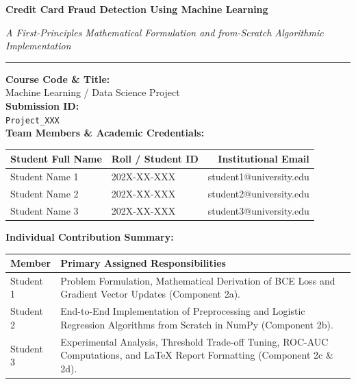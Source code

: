 \documentclass[11pt,a4paper]{article}
\begin{document}
\begin{titlepage}
    \centering
    \vspace*{1.5cm}
    
    {\Huge \bfseries Credit Card Fraud Detection Using Machine Learning\par}
    \vspace{0.4cm}
    {\Large \itshape A First-Principles Mathematical Formulation and from-Scratch Algorithmic Implementation\par}
    
    \vspace{1.2cm}
    \rule{\linewidth}{0.6mm}
    \vspace{0.8cm}
    
    {\large \textbf{Course Code \& Title:}}\\[0.2cm]
    {\large Machine Learning / Data Science Project}\\[0.6cm]
    
    {\large \textbf{Submission ID:}}\\[0.2cm]
    {\large \texttt{Project\_XXX}}\\[1.0cm]
    
    {\large \textbf{Team Members \& Academic Credentials:}}\\[0.4cm]
    \begin{tabular}{llr}
        \toprule
        \textbf{Student Full Name} & \textbf{Roll / Student ID} & \textbf{Institutional Email} \\
        \midrule
        Student Name 1 & 202X-XX-XXX & student1@university.edu \\
        Student Name 2 & 202X-XX-XXX & student2@university.edu \\
        Student Name 3 & 202X-XX-XXX & student3@university.edu \\
        \bottomrule
    \end{tabular}
    
    \vspace{1.0cm}
    
    {\large \textbf{Individual Contribution Summary:}}\\[0.3cm]
    \begin{tabularx}{0.85\linewidth}{lX}
        \toprule
        \textbf{Member} & \textbf{Primary Assigned Responsibilities} \\
        \midrule
        Student 1 & Problem Formulation, Mathematical Derivation of BCE Loss and Gradient Vector Updates (Component 2a). \\
        Student 2 & End-to-End Implementation of Preprocessing and Logistic Regression Algorithms from Scratch in NumPy (Component 2b). \\
        Student 3 & Experimental Analysis, Threshold Trade-off Tuning, ROC-AUC Computations, and LaTeX Report Formatting (Component 2c \& 2d). \\
        \bottomrule
    \end{tabularx}
    

\end{titlepage}
\end{document}

